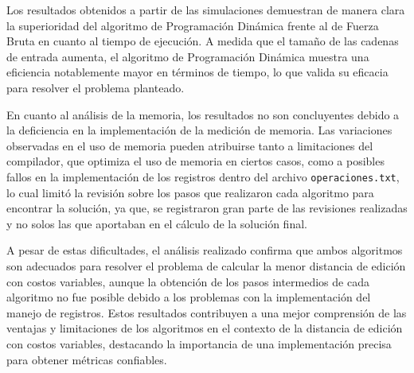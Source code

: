 Los resultados obtenidos a partir de las simulaciones demuestran de manera clara la superioridad del algoritmo de Programación Dinámica frente al de Fuerza Bruta en cuanto al tiempo de ejecución. A medida que el tamaño de las cadenas de entrada aumenta, el algoritmo de Programación Dinámica muestra una eficiencia notablemente mayor en términos de tiempo, lo que valida su eficacia para resolver el problema planteado.

En cuanto al análisis de la memoria, los resultados no son concluyentes debido a la deficiencia en la implementación de la medición de memoria. Las variaciones observadas en el uso de memoria pueden atribuirse tanto a limitaciones del compilador, que optimiza el uso de memoria en ciertos casos, como a posibles fallos en la implementación de los registros dentro del archivo \texttt{operaciones.txt}, lo cual limitó la revisión sobre los pasos que realizaron cada algoritmo para encontrar la solución, ya que, se registraron gran parte de las revisiones realizadas y no solos las que aportaban en el cálculo de la solución final.

A pesar de estas dificultades, el análisis realizado confirma que ambos algoritmos son adecuados para resolver el problema de calcular la menor distancia de edición con costos variables, aunque la obtención de los pasos intermedios de cada algoritmo no fue posible debido a los problemas con la implementación del manejo de registros. Estos resultados contribuyen a una mejor comprensión de las ventajas y limitaciones de los algoritmos en el contexto de la distancia de edición con costos variables, destacando la importancia de una implementación precisa para obtener métricas confiables.



